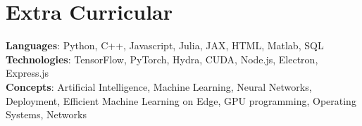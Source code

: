\section{Extra Curricular}
    \begin{itemize}[leftmargin=0.15in, label={}]
	\small{\item{
		\textbf{Languages}{: Python, C++, Javascript, Julia, JAX, HTML, Matlab, SQL} \\
		\textbf{Technologies}{: TensorFlow, PyTorch, Hydra, CUDA, Node.js, Electron, Express.js} \\
		\textbf{Concepts}{: Artificial Intelligence, Machine Learning, Neural Networks, Deployment, Efficient Machine Learning on Edge, GPU programming, Operating Systems, Networks}
	}}
    \end{itemize}